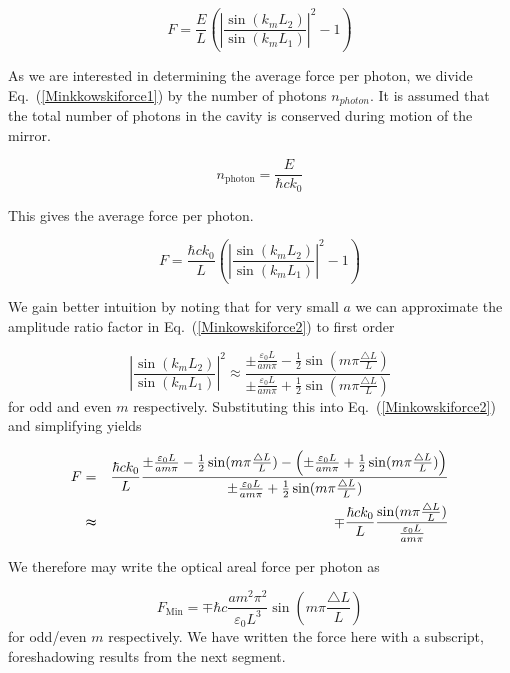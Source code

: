 \begin{equation}
F=\frac{E}{L}\left(\left|\frac{\sin(k_{m}L_{2})}{\sin(k_{m}L_{1})}\right|^{2}-1\right)
\label{Minkkowskiforce1}
\end{equation}

As we are interested in determining the average force per photon, we divide Eq.\ (\ref{Minkkowskiforce1}) by the number of photons $n_{photon}$.  It is assumed that the total number of photons in the cavity is conserved during motion of the mirror.  

\begin{equation}
n_{\mathrm{photon}}=\frac{E}{\hbar ck_0}
\label{photonnumber}
\end{equation}

This gives the average force per photon.

\begin{equation}
F=\frac{\hbar ck_0}{L}\left(\left|\frac{\sin(k_{m}L_{2})}{\sin(k_{m}L_{1})}\right|^{2}-1\right)
\label{Minkowskiforce2}
\end{equation}

We gain better intuition by noting that for very small $a$ we can approximate the amplitude ratio factor in Eq.\ (\ref{Minkowskiforce2}) to first order 

\begin{equation}
\left|\frac{\sin(k_{m}L_{2})}{\sin(k_{m}L_{1})}\right|^{2}\approx\frac{\pm\frac{\varepsilon_{0}L}{a m\pi}-\frac{1}{2}\sin(m\pi\frac{\triangle L}{L})}{\pm\frac{\varepsilon_{0}L}{a m\pi}+\frac{1}{2}\sin(m\pi\frac{\triangle L}{L})}
\label{amplitudeapproximation}
\end{equation}
for odd and even $m$ respectively. Substituting this into Eq.\ (\ref{Minkowskiforce2}) and simplifying yields

\begin{eqnarray}
F&=&\frac{\hbar ck_0}{L}\frac{\pm\frac{\varepsilon_{0}L}{a m\pi}-\frac{1}{2}\sin(m\pi\frac{\triangle L}{L})-\left(\pm\frac{\varepsilon_{0}L}{a m\pi}+\frac{1}{2}\sin(m\pi\frac{\triangle L}{L})\right)}{\pm\frac{\varepsilon_{0}L}{a m\pi}+\frac{1}{2}\sin(m\pi\frac{\triangle L}{L})} \nonumber \\
&\thickapprox &\mp\frac{\hbar ck_0}{L}\frac{\sin(m\pi\frac{\triangle L}{L})}{\frac{\varepsilon_{0}L}{a m\pi}}
\label{Minkowskiforce3}
\end{eqnarray}

We therefore may write the optical areal force per photon as 

\begin{equation}
F_{\mathrm{Min}}=\mp\hbar c\frac{a m^{2}\pi^{2}}{\varepsilon_{0}L^{3}}\sin(m\pi\frac{\triangle L}{L})
\label{Minkowskiforce4}
\end{equation}
for odd/even $m$ respectively.  We have written the force here with a subscript, foreshadowing results from the next segment.


